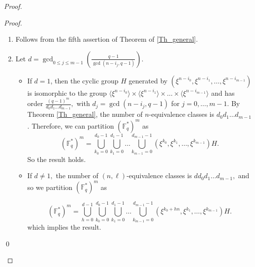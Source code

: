 \documentclass[12pt]{elsarticle}
\newcommand{\Fq}{\mathbb{F}_{q}}
\theoremstyle{break}
{\theorembodyfont{\upshape}
    \newtheorem{theorem}{Theorem}[section] %
    \newtheorem{lemma}[theorem]{Lemma} %
    \newtheorem{proposition}[theorem]{Proposition}
    \newtheorem{corollary}[theorem]{Corollary}
    \newtheorem{definition}[theorem]{Definition}
    \newtheorem{example}[theorem]{Example}
    \newtheorem{remark}[theorem]{Remark}
    \newtheorem{conjecture}[theorem]{Conjecture}
    \newtheorem*{proof}{{Proof}}
	\newtheorem*{notation}{Notation}
	\newtheorem*{main}{Cain Theorem}
	\newtheorem*{problem}{Problem}
}
\begin{document}
    \begin{proof}
        \begin{proof}
        
\begin{enumerate}

\item Follows from the fifth assertion of  Theorem of \ref{Th_general}.
\item Let $d= \gcd_{ 0\leq j\leq m-1} \left( \frac{q-1}{ \gcd(n-i_j,q-1)}\right).$
\begin{itemize}
    \item  If $ d = 1 $, then the cyclic group $ H $ generated by $ (\xi^{n-{i_0}}, \xi^{n-{i_1}} , \ldots, \xi^{n-{i_{m-1}}}) $ is isomorphic to the group $ \langle \xi^{n-{i_0}} \rangle \times \langle \xi^{n-{i_1}} \rangle \times \ldots \times \langle \xi^{n-{i_{m-1}}} \rangle $ and has order $ \frac{(q-1)^m}{  d_0 d_{1} \ldots d_{m-1}}, $ with $ d_j=\gcd(n-i_j,q-1)$ for $j=0,\ldots, m-1$. By Theorem \ref{Th_general}, the number of $ n$-equivalence classes is $ d_0 d_{1} \ldots d_{m-1} $. Therefore, we can partition $ (\Fq^*)^m $ as 
$$
(\Fq^*)^m =  \bigcup_{k_0=0}^{d_0-1} \bigcup_{k_{1}=0}^{d_{1}-1} \ldots \bigcup_{k_{m-1}=0}^{d_{m-1}-1} (\xi^{k_0}, \xi^{k_1},\ldots, \xi^{k_{m-1}}) H.
$$
So the result holds.
 \item 
 If $d\neq 1, $ the number of  $(n,\ell)$-equivalence classes is $ d d_0 d_{1} \ldots d_{m-1},$ and so we partition $ (\Fq^*)^m  $ as 
 
$$
(\Fq^*)^m  = \bigcup_{h=0}^{d-1} \bigcup_{k_0=0}^{d_0-1} \bigcup_{k_{1}=0}^{d_{1}-1} \ldots \bigcup_{k_{m-1}=0}^{d_{m-1}-1} (\xi^{k_0+hn}, \xi^{k_1},\ldots, \xi^{k_{m-1}}) H.
$$
which implies the result.
\end{itemize}

\end{enumerate}
  \qed
\end{proof}
    \end{proof}
\end{document}

